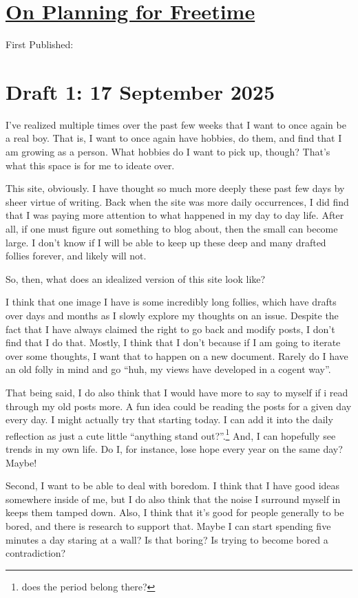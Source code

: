 \documentclass[12pt]{article}
\newcommand{\say}[1]{``#1''}
\renewcommand{\,}{\textsuperscript{,}}
\begin{document}
  
\doublespacing  
\section{\href{planning-for-freetime.html}{On Planning for Freetime}}  
First Published: 
\section{Draft 1: 17 September 2025}
I've realized multiple times over the past few weeks that I want to once again be a real boy.
That is, I want to once again have hobbies, do them, and find that I am growing as a person.
What hobbies do I want to pick up, though?
That's what this space is for me to ideate over.

This site, obviously.
I have thought so much more deeply these past few days by sheer virtue of writing.
Back when the site was more daily occurrences, I did find that I was paying more attention to what happened in my day to day life.
After all, if one must figure out something to blog about, then the small can become large.
I don't know if I will be able to keep up these deep and many drafted follies forever, and likely will not.

So, then, what does an idealized version of this site look like?

I think that one image I have is some incredibly long follies, which have drafts over days and months as I slowly explore my thoughts on an issue.
Despite the fact that I have always claimed the right to go back and modify posts, I don't find that I do that.
Mostly, I think that I don't because if I am going to iterate over some thoughts, I want that to happen on a new document.
Rarely do I have an old folly in mind and go \say{huh, my views have developed in a cogent way}.

That being said, I do also think that I would have more to say to myself if i read through my old posts more.
A fun idea could be reading the posts for a given day every day.
I might actually try that starting today.
I can add it into the daily reflection as just a cute little \say{anything stand out?}.\footnote{does the period belong there?}
And, I can hopefully see trends in my own life.
Do I, for instance, lose hope every year on the same day?
Maybe!

Second, I want to be able to deal with boredom.
I think that I have good ideas somewhere inside of me, but I do also think that the noise I surround myself in keeps them tamped down.
Also, I think that it's good for people generally to be bored, and there is research to support that.
Maybe I can start spending five minutes a day staring at a wall?
Is that boring?
Is trying to become bored a contradiction?
\end{document}
